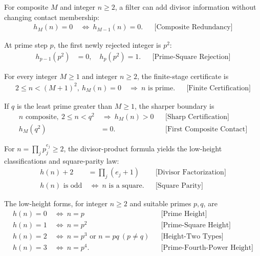 For composite $M$ and integer $n\ge2$, a filter can add divisor information
without changing contact membership:
\begin{equation*}
\begin{aligned}
h_M(n)=0&\ \Longleftrightarrow\ h_{M-1}(n)=0.
&&\text{[Composite Redundancy]}
\end{aligned}
\end{equation*}

At prime step $p$, the first newly rejected integer is $p^2$:
\begin{equation*}
\begin{aligned}
h_{p-1}(p^2)&=0,\quad h_p(p^2)=1.
&&\text{[Prime-Square Rejection]}
\end{aligned}
\end{equation*}

For every integer $M\ge1$ and integer $n\ge2$, the finite-stage certificate is
\begin{equation*}
\begin{aligned}
2\le n < (M+1)^2,\ h_M(n)=0
&\ \Longrightarrow\ n\text{ is prime}.
&&\text{[Finite Certification]}
\end{aligned}
\end{equation*}

If $q$ is the least prime greater than $M\ge1$, the sharper boundary is
\begin{equation*}
\begin{aligned}
n\text{ composite},\ 2\le n < q^2
&\ \Longrightarrow\ h_M(n) > 0
&&\text{[Sharp Certification]}\\
h_M(q^2)&=0.
&&\text{[First Composite Contact]}
\end{aligned}
\end{equation*}

For $n=\prod_jp_j^{e_j}\ge2$, the divisor-product formula yields the low-height
classifications and square-parity law:
\begin{equation*}
\begin{aligned}
h(n)+2&=\prod_j(e_j+1)
&&\text{[Divisor Factorization]}\\
h(n)\text{ is odd}&\ \Longleftrightarrow\ n\text{ is a square}.
&&\text{[Square Parity]}
\end{aligned}
\end{equation*}

The low-height forms, for integer $n\ge2$ and suitable primes $p,q$, are
\begin{equation*}
\begin{aligned}
h(n)=0&\ \Longleftrightarrow\ n=p
&&\text{[Prime Height]}\\
h(n)=1&\ \Longleftrightarrow\ n=p^2
&&\text{[Prime-Square Height]}\\
h(n)=2&\ \Longleftrightarrow\ n=p^3\text{ or }n=pq\ (p\ne q)
&&\text{[Height-Two Types]}\\
h(n)=3&\ \Longleftrightarrow\ n=p^4.
&&\text{[Prime-Fourth-Power Height]}
\end{aligned}
\end{equation*}

